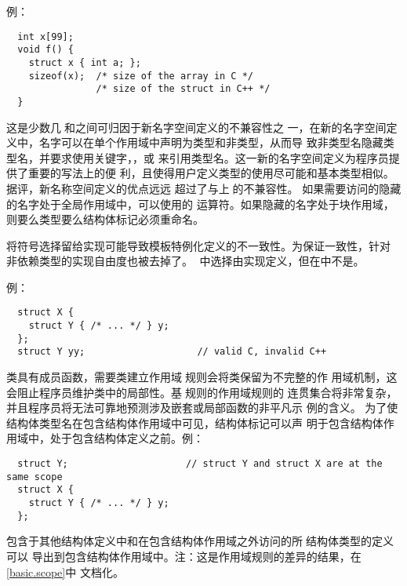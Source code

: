 例：
\begin{lstlisting}
  int x[99];
  void f() {
    struct x { int a; };
    sizeof(x);  /* size of the array in C */
                /* size of the struct in C++ */
  }
\end{lstlisting}
\diffrat 这是少数几个\c{}和\cpp{}之间可归因于新\cpp{}名字空间定义的不兼容性之
一，在新的\cpp{}名字空间定义中，名字可以在单个作用域中声明为类型和非类型，从而导
致非类型名隐藏类型名，并要求使用关键字，，或
来引用类型名。这一新的名字空间定义为\cpp{}程序员提供了重要的写法上的便
利，且使得用户定义类型的使用尽可能和基本类型相似。据评，新名称空间定义的优点远远
超过了与上述\c{}的不兼容性。
\diffeff \semchg
\diffdiff \semchg 如果需要访问的隐藏的名字处于全局作用域中，可以使用\cpp{}的
\tm{::}运算符。如果隐藏的名字处于块作用域，则要么类型要么结构体标记必须重命名。
\diffuse \seldom

\diffrat 将符号选择留给实现可能导致模板特例化定义的不一致性。为保证一致性，针对
非依赖类型的实现自由度也被去掉了。
\diffeff 在\c{}中选择由实现定义，但在\cpp{}中不是。
\diffdiff \syntrans
\diffuse \seldom

例：
\begin{lstlisting}
  struct X {
    struct Y { /* ... */ } y;
  };
  struct Y yy;                    // valid C, invalid C++
\end{lstlisting}
\diffrat \cpp{}类具有成员函数，需要类建立作用域。\c{}规则会将类保留为不完整的作
用域机制，这会阻止\cpp{}程序员维护类中的局部性。基于\c{}规则的\cpp{}作用域规则的
连贯集合将非常复杂，并且\cpp{}程序员将无法可靠地预测涉及嵌套或局部函数的非平凡示
例的含义。
\diffeff \semchg
\diffdiff \semtrans 为了使结构体类型名在包含结构体作用域中可见，结构体标记可以声
明于包含结构体作用域中，处于包含结构体定义之前。例：
\begin{lstlisting}
  struct Y;                     // struct Y and struct X are at the same scope
  struct X {
    struct Y { /* ... */ } y;
  };
\end{lstlisting}
包含于其他结构体定义中和在包含结构体作用域之外访问的所有\c{}结构体类型的定义可以
导出到包含结构体作用域中。注：这是作用域规则的差异的结果，在\ref{basic.scope}中
文档化。
\diffuse \seldom

